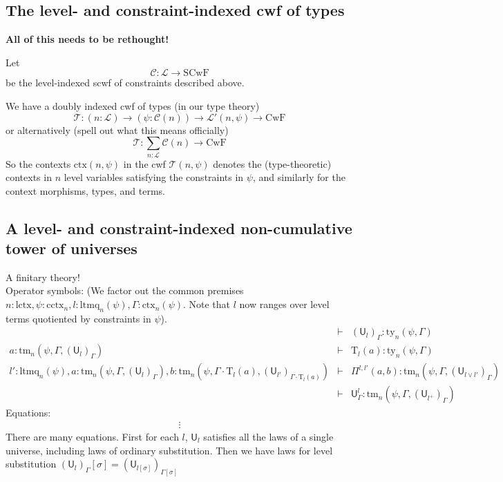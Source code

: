 \documentclass[11pt,a4paper]{article}
\theoremstyle{definition}
\newcommand{\UU}{\mathsf{U}}
\newcommand{\Ctx}{\mathrm{Ctx}}
\def\UU{\mathsf{U}}
\newcommand{\N}{\mathsf{N}}
\newcommand{\T}{\mathsf{T}}
\def\Pihat{\Pi}
\def\Ctx{\mathrm{ctx}}
\def\lctx{\mathrm{lctx}}
\def\ltm{\mathrm{ltm}}
\def\ltmq{\mathrm{ltmq}}
\def\cctx{\mathrm{cctx}}
\newcommand{\ctx}{\mathrm{ctx}}
\newcommand{\ty}{\mathrm{ty}}
\newcommand{\tm}{\mathrm{tm}}
\def\U{\mathsf{U}}
\def\T{\mathcal{T}}
\newcommand{\Ta}{\mathrm{T}}
\def\L{{\mathcal{L}}}
\def\F{\mathcal{C}}
\def\CwF{\mathrm{CwF}}
\def\SCwF{\mathrm{SCwF}}
\begin{document}
\subsection{The level- and constraint-indexed cwf of types}

{\bf All of this needs to be rethought!}

Let 
$$
\F : \L \to \SCwF
$$
be the level-indexed scwf of constraints described above.

We have a doubly indexed cwf of types (in our type theory)
$$
\T : (n : \L) \to (\psi : \F(n)) \to \L '(n,\psi) \to \CwF
$$
or alternatively (spell out what this means officially)
$$
\T : \sum_{n : \L}\F(n) \to \CwF
$$
So the contexts $\Ctx(n,\psi)$ in the cwf $\T(n,\psi)$ denotes the (type-theoretic) contexts in $n$ level variables satisfying the constraints in $\psi$, and similarly for the context morphisms, types, and terms.

\subsection{A level- and constraint-indexed non-cumulative tower of universes}


A finitary theory!
\\
\vspace{1ex}
Operator symbols: (We  factor out the common premises $n : \lctx, \psi : \cctx_n, l : \ltmq_n(\psi), \Gamma : \ctx_n(\psi)$. Note that $l$ now ranges over level terms quotiented by constraints in $\psi$).
\begin{eqnarray*}
&\vdash& (\U_{l})_\Gamma : \ty_n(\psi,\Gamma)\\
a : \tm_n(\psi,\Gamma,(\U_{l})_\Gamma) &\vdash& {\Ta_{l}}(a) : \ty_n(\psi,\Gamma)\\
l' : \ltmq_n(\psi),
a : \tm_n(\psi,\Gamma,(\U_{l})_\Gamma),
b :  \tm_n(\psi,\Gamma \cdot \Ta_{l}(a), (\U_{l'})_{\Gamma \cdot \Ta_{l}(a)})
&\vdash&
 \Pihat^{l,l'}(a,b) : \tm_n(\psi,\Gamma,(\U_{l \vee l'})_\Gamma)\\
 &\vdash&\UU^l_\Gamma: \tm_n(\psi,\Gamma,(\UU_{l^+})_\Gamma)
\end{eqnarray*}
Equations:
\begin{eqnarray*}
&\vdots&
\end{eqnarray*}
There are many equations. First for each $l$, $\U_l$ satisfies all the laws of a single universe, including laws of ordinary substitution. Then we have laws for level substitution $(\U_{l})_\Gamma[\sigma] = (\U_{l[\sigma]})_{\Gamma[\sigma]}$
\end{document}
